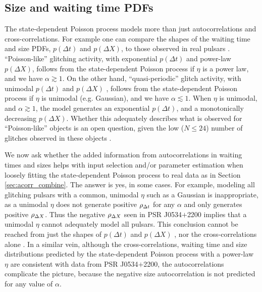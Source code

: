 \subsection{Size and waiting time PDFs}
The state-dependent Poisson process models more than just autocorrelations and cross-correlations. For example one can compare the shapes of the waiting time and size PDFs, $p(\Delta t)$ and $p(\Delta X)$, to those observed in real pulsars \citep{Howitt2018, Carlin2019quasi}. ``Poisson-like'' glitching activity, with exponential $p(\Delta t)$ and power-law $p(\Delta X)$, follows from the state-dependent Poisson process if $\eta$ is a power law, and we have $\alpha \gtrsim 1$. On the other hand, ``quasi-periodic'' glitch activity, with unimodal $p(\Delta t)$ and $p(\Delta X)$ \citep{Melatos2008, Howitt2018}, follows from the state-dependent Poisson process if $\eta$ is unimodal (e.g. Gaussian), and we have $\alpha \lesssim 1$. When $\eta$ is unimodal, and $\alpha \gtrsim 1$, the model generates an exponential $p(\Delta t)$, and a monotonically decreasing $p(\Delta X)$. Whether this adequately describes what is observed for ``Poisson-like'' objects is an open question, given the low ($N\leq24$) number of glitches observed in these objects \citep{Carlin2019quasi}. 

We now ask whether the added information from autocorrelations in waiting times and sizes helps with input selection and/or parameter estimation when loosely fitting the state-dependent Poisson process to real data as in Section \ref{sec:acorr_combine}. The answer is yes, in some cases. For example, modeling all glitching pulsars with a common, unimodal $\eta$ such as a Gaussian is inappropriate, as a unimodal $\eta$ does not generate positive $\rho_{\Delta t}$ for any $\alpha$ and only generates positive $\rho_{\Delta X}$. Thus the negative $\rho_{\Delta X}$ seen in PSR J0534$+$2200 implies that a unimodal $\eta$ cannot adequately model all pulsars. This conclusion cannot be reached from just the shapes of $p(\Delta t)$ and $p(\Delta X)$ \citep{Carlin2019quasi}, nor the cross-correlations alone \citep{Melatos2018}. In a similar vein, although the cross-correlations, waiting time and size distributions predicted by the state-dependent Poisson process with a power-law $\eta$ are consistent with data from PSR J0534$+$2200, the autocorrelations complicate the picture, because the negative size autocorrelation is not predicted for any value of $\alpha$. 


